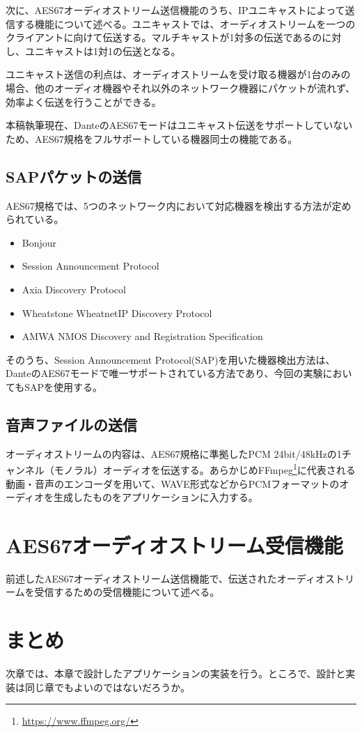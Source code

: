 次に、AES67オーディオストリーム送信機能のうち、IPユニキャストによって送信する機能について述べる。ユニキャストでは、オーディオストリームを一つのクライアントに向けて伝送する。マルチキャストが1対多の伝送であるのに対し、ユニキャストは1対1の伝送となる。

ユニキャスト送信の利点は、オーディオストリームを受け取る機器が1台のみの場合、他のオーディオ機器やそれ以外のネットワーク機器にパケットが流れず、効率よく伝送を行うことができる。

本稿執筆現在、DanteのAES67モードはユニキャスト伝送をサポートしていないため、AES67規格をフルサポートしている機器同士の機能である。

\subsection{SAPパケットの送信}

AES67規格では、5つのネットワーク内において対応機器を検出する方法が定められている。

\begin{itemize}
  \item {Bonjour}
  \item {Session Announcement Protocol}
  \item {Axia Discovery Protocol}
  \item {Wheatstone WheatnetIP Discovery Protocol}
  \item {AMWA NMOS Discovery and Registration Specification}
\end{itemize}

そのうち、Session Announcement Protocol(SAP)を用いた機器検出方法は、DanteのAES67モードで唯一サポートされている方法であり、今回の実験においてもSAPを使用する。

\subsection{音声ファイルの送信}

オーディオストリームの内容は、AES67規格に準拠したPCM 24bit/48kHzの1チャンネル（モノラル）オーディオを伝送する。あらかじめFFmpeg\footnote{\url{https://www.ffmpeg.org/}}に代表される動画・音声のエンコーダを用いて、WAVE形式などからPCMフォーマットのオーディオを生成したものをアプリケーションに入力する。

\section{AES67オーディオストリーム受信機能}

前述したAES67オーディオストリーム送信機能で、伝送されたオーディオストリームを受信するための受信機能について述べる。

\section{まとめ}

次章では、本章で設計したアプリケーションの実装を行う。ところで、設計と実装は同じ章でもよいのではないだろうか。
